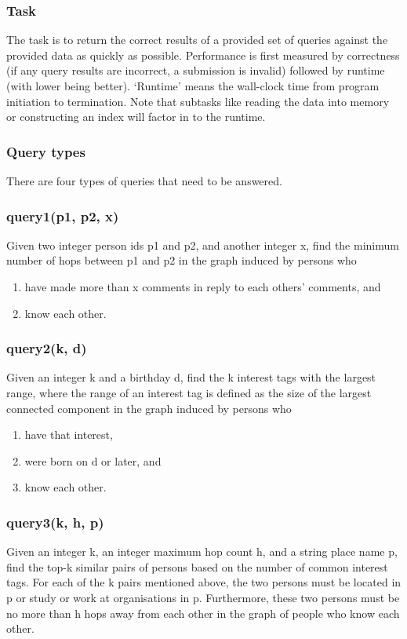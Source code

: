 \documentclass{article}
\begin{document}
\subsubsection{Task}
The task is to return the correct results of a provided set of queries
against the provided data as quickly as possible.  Performance is
first measured by correctness (if any query results are incorrect, a
submission is invalid) followed by runtime (with lower being better).
`Runtime' means the wall-clock time from program initiation to
termination.  Note that subtasks like reading the data into memory or
constructing an index will factor in to the runtime.

\subsubsection{Query types}
There are four types of queries that need to be answered.

\subsubsection{query1(p1, p2, x)}
Given two integer person ids p1 and p2, and another integer x, find
the minimum number of hops between p1 and p2 in the graph induced by
persons who
\begin{enumerate}
\item have made more than x comments in reply to each others'
comments, and
\item know each other.
\end{enumerate}

\subsubsection{query2(k, d)}
Given an integer k and a birthday d, find the k interest tags with the largest range, where the range of an interest tag is defined as the size of the largest connected component in the graph induced by persons who
\begin{enumerate}
\item have that interest,
\item were born on d or later, and
\item know each other.
\end{enumerate}

\subsubsection{query3(k, h, p)}
Given an integer k, an integer maximum hop count h, and a string place
name p, find the top-k similar pairs of persons based on the number of
common interest tags. For each of the k pairs mentioned above, the two
persons must be located in p or study or work at organisations in
p. Furthermore, these two persons must be no more than h hops away
from each other in the graph of people who know each other.
\end{document}
